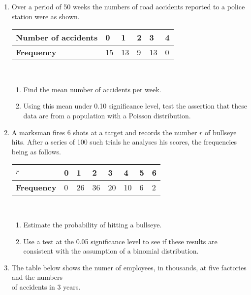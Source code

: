 \documentclass[fleqn]{article}
\begin{document}
\exercise{}
\begin{enumerate}
    \setlength\itemsep{0.5em}
    \item Over a period of 50 weeks the numbers of road accidents reported to a police station were as shown.\vspace{2mm}\\
        \begin{tabularx}{0.6\textwidth}{|X|*5{P{10mm}|}}
            \hline
            \textbf{Number of accidents} & 0  & 1  & 2 & 3  & 4 \\\hline
            \textbf{Frequency}           & 15 & 13 & 9 & 13 & 0 \\\hline
        \end{tabularx}\vspace{3mm}\\
        \begin{enumerate}[label=\bfseries \alph*\space ]
            \item Find the mean number of accidents per week.
            \item Using this mean under 0.10 significance level, test the assertion that these data are from a population with a Poisson distribution.
        \end{enumerate}
    \item A marksman fires 6 shots at a target and records the number $r$ of bullseye hits. After a series of 100 such trials he analyses his scores, the frequencies being as follows.\vspace{2mm}\\
        \begin{tabularx}{0.65\textwidth}{|X|*7{P{10mm}|}}
            \hline
            \textbf{$r$}       & 0 & 1  & 2  & 3  & 4  & 5 & 6 \\\hline
            \textbf{Frequency} & 0 & 26 & 36 & 20 & 10 & 6 & 2 \\\hline
        \end{tabularx}\vspace{3mm}\\
        \begin{enumerate}[label=\bfseries \alph*\space ]
            \item Estimate the probability of hitting a bullseye.
            \item Use a test at the 0.05 significance level to see if these results are consistent with the assumption of a binomial distribution.
        \end{enumerate}
    \item The table below shows the numer of employees, in thousands, at five factories and the numbers \\of accidents in 3 years.\vspace{2mm}\\

\end{enumerate}
\end{document}
